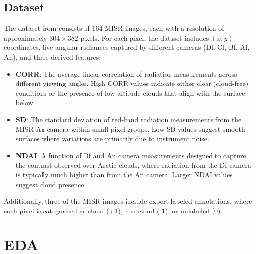 \documentclass[10pt,letterpaper]{article}
\begin{document}
\subsection{Dataset}

The dataset from \cite{shi2008daytime} consists of $164$ MISR images, each with a resolution of approximately $304 \times 382$ pixels. For each pixel, the dataset includes $(x, y)$ coordinates, five angular radiances captured by different cameras (Df, Cf, Bf, Af, An), and three derived features:

\begin{itemize}
    \item \textbf{CORR}: The average linear correlation of radiation measurements across different viewing angles. High CORR values indicate either clear (cloud-free) conditions or the presence of low-altitude clouds that align with the surface below.
    \item \textbf{SD}: The standard deviation of red-band radiation measurements from the MISR An camera within small pixel groups. Low SD values suggest smooth surfaces where variations are primarily due to instrument noise.
    \item \textbf{NDAI}: A function of Df and An camera measurements designed to capture the contrast observed over Arctic clouds, where radiation from the Df camera is typically much higher than from the An camera. Larger NDAI values suggest cloud presence.
\end{itemize}

Additionally, three of the MISR images include expert-labeled annotations, where each pixel is categorized as cloud (+1), non-cloud (-1), or unlabeled (0).

\section{EDA}



\end{document}
